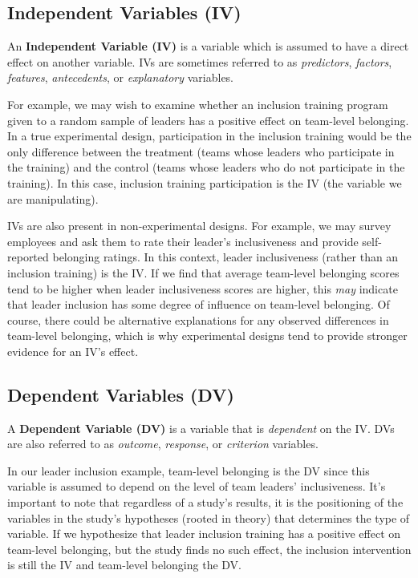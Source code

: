 \documentclass[]{book}
\begin{document}
\hypertarget{independent-variables-iv}{%
\subsection{Independent Variables (IV)}\label{independent-variables-iv}}

An \textbf{Independent Variable (IV)} is a variable which is assumed to have a direct effect on another variable. IVs are sometimes referred to as \emph{predictors}, \emph{factors}, \emph{features}, \emph{antecedents}, or \emph{explanatory} variables.

For example, we may wish to examine whether an inclusion training program given to a random sample of leaders has a positive effect on team-level belonging. In a true experimental design, participation in the inclusion training would be the only difference between the treatment (teams whose leaders who participate in the training) and the control (teams whose leaders who do not participate in the training). In this case, inclusion training participation is the IV (the variable we are manipulating).

IVs are also present in non-experimental designs. For example, we may survey employees and ask them to rate their leader's inclusiveness and provide self-reported belonging ratings. In this context, leader inclusiveness (rather than an inclusion training) is the IV. If we find that average team-level belonging scores tend to be higher when leader inclusiveness scores are higher, this \emph{may} indicate that leader inclusion has some degree of influence on team-level belonging. Of course, there could be alternative explanations for any observed differences in team-level belonging, which is why experimental designs tend to provide stronger evidence for an IV's effect.

\hypertarget{dependent-variables-dv}{%
\subsection{Dependent Variables (DV)}\label{dependent-variables-dv}}

A \textbf{Dependent Variable (DV)} is a variable that is \emph{dependent} on the IV. DVs are also referred to as \emph{outcome}, \emph{response}, or \emph{criterion} variables.

In our leader inclusion example, team-level belonging is the DV since this variable is assumed to depend on the level of team leaders' inclusiveness. It's important to note that regardless of a study's results, it is the positioning of the variables in the study's hypotheses (rooted in theory) that determines the type of variable. If we hypothesize that leader inclusion training has a positive effect on team-level belonging, but the study finds no such effect, the inclusion intervention is still the IV and team-level belonging the DV.
\end{document}
